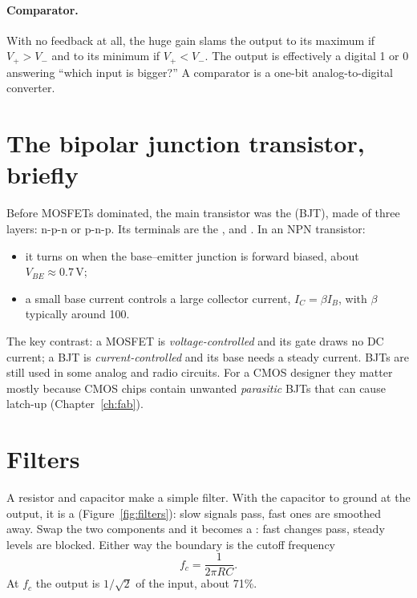 \paragraph{Comparator.} With no feedback at all, the huge gain slams the output to its maximum if $V_+ > V_-$ and to its minimum if $V_+ < V_-$. The output is effectively a digital 1 or 0 answering ``which input is bigger?'' A comparator is a one-bit analog-to-digital converter.

\section{The bipolar junction transistor, briefly}

Before MOSFETs dominated, the main transistor was the  (BJT), made of three layers: n-p-n or p-n-p. Its terminals are the ,  and . In an NPN transistor:
\begin{itemize}
  \item it turns on when the base--emitter junction is forward biased, about $V_{BE} \approx 0.7$\,V;
  \item a small base current controls a large collector current, $I_C = \beta I_B$, with $\beta$ typically around 100.
\end{itemize}
The key contrast: a MOSFET is \emph{voltage-controlled} and its gate draws no DC current; a BJT is \emph{current-controlled} and its base needs a steady current. BJTs are still used in some analog and radio circuits. For a CMOS designer they matter mostly because CMOS chips contain unwanted \emph{parasitic} BJTs that can cause latch-up (Chapter~\ref{ch:fab}).

\section{Filters}

A resistor and capacitor make a simple filter. With the capacitor to ground at the output, it is a  (Figure~\ref{fig:filters}): slow signals pass, fast ones are smoothed away. Swap the two components and it becomes a : fast changes pass, steady levels are blocked. Either way the boundary is the cutoff frequency
\[
  f_c = \frac{1}{2\pi R C}.
\]
At $f_c$ the output is $1/\sqrt{2}$ of the input, about 71\%.

